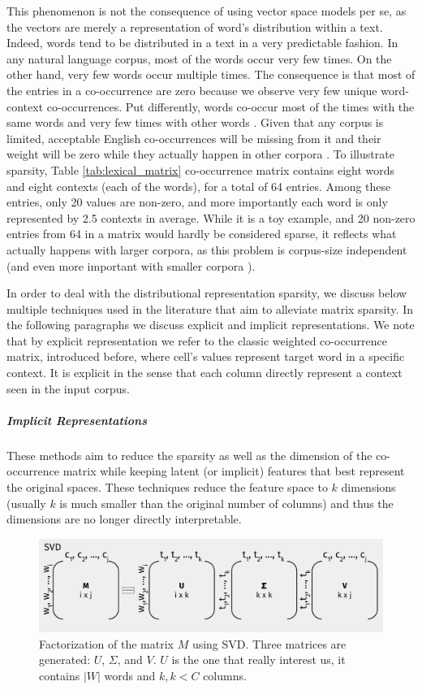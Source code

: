 This phenomenon is not the consequence of using vector space models per se,  as the vectors are merely a representation of  word's distribution within a text. Indeed, words tend to be distributed in a text in a very predictable fashion. In any natural language corpus, most of the words occur very few times. On the other hand, very few words occur multiple times. The consequence is that most of the entries in a co-occurrence are zero because we observe very few unique word-context co-occurrences. Put differently, words co-occur most of the times with the same words and  very few times with other words \cite{sahlgren2006word}. Given that any corpus is limited, acceptable English co-occurrences will be missing from it and their weight will be zero while they  actually happen in other corpora \cite{JurafskyM17}. To illustrate sparsity, Table \ref{tab:lexical_matrix} co-occurrence matrix contains eight words and eight contexts (each of the words), for a total of 64 entries. Among these entries, only 20 values are non-zero, and more importantly each word is only represented  by 2.5 contexts in average. While it is a toy example, and 20 non-zero entries from 64 in a matrix would hardly be considered sparse, it reflects what actually happens with larger corpora, as this problem is corpus-size independent (and even more important with smaller corpora \cite{perinet2015}). 


In order to deal with the distributional representation sparsity, we discuss below multiple techniques used in the literature \cite{sahlgren2006word,RatinovR09,piero2017} that aim to alleviate matrix sparsity.  In the following paragraphs we discuss explicit and implicit representations. We note that by explicit representation we refer to the classic weighted co-occurrence matrix, introduced before, where cell's values represent target word in a specific context. It is explicit in the sense that each column directly represent a context seen in the input corpus.
%


\subparagraph{Implicit Representations}
These methods aim to reduce the sparsity as well as the dimension of the co-occurrence matrix while keeping latent (or implicit) features that best represent the original spaces. These techniques reduce the feature space to $k$ dimensions (usually $k$ is much smaller than the original number of columns) and thus the dimensions  are no longer directly interpretable.

\begin{figure}
\centering
\includegraphics[width=.8\linewidth]{images/Chapitre2/svd.pdf}
\caption{Factorization of the matrix $M$ using SVD. Three matrices are generated: $U$, $\Sigma$, and $V$. $U$ is the one that really interest us, it contains $|W|$ words and $k, k<C$ columns.}
\label{fig:svd}
\end{figure}

